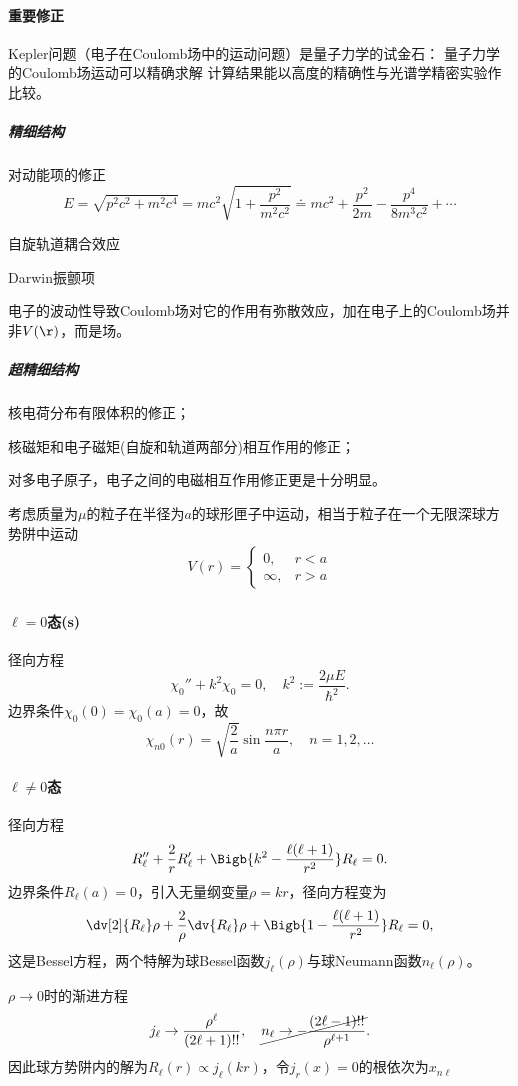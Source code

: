 \paragraph{重要修正}
Kepler问题（电子在Coulomb场中的运动问题）是量子力学的试金石：
量子力学的Coulomb场运动可以精确求解
计算结果能以高度的精确性与光谱学精密实验作比较。
\subparagraph*{精细结构}
\begin{compactenum}
	\item 对动能项的修正
	\[
		E=\sqrt{p^2c^2+m^2c^4}=mc^2\sqrt{1+\frac{p^2}{m^2c^2}}\doteq mc^2+\frac{p^2}{2m}-\frac{p^4}{8m^3c^2}+\cdots
	\]
	\item 自旋轨道耦合效应
	\item Darwin振颤项

	电子的波动性导致Coulomb场对它的作用有弥散效应，加在电子上的Coulomb场并非$V(\r)$，而是场。
\end{compactenum}
\subparagraph*{超精细结构}
\begin{compactenum}
	\item 核电荷分布有限体积的修正；
	\item 核磁矩和电子磁矩(自旋和轨道两部分)相互作用的修正；
	\item 对多电子原子，电子之间的电磁相互作用修正更是十分明显。
\end{compactenum}
考虑质量为$\mu$的粒子在半径为$a$的球形匣子中运动，相当于粒子在一个无限深球方势阱中运动
\begin{align*}
	V(r)=\begin{cases}
		0, & r<a \\[
	-1ex]\infty,&r>a
	\end{cases}
\end{align*}
\paragraph{$\ell=0$态(s)}径向方程
\[
	\chi_0''+k^2\chi_0=0,\quad k^2:=\frac{2\mu E}{\hbar^2}.
\]
边界条件$\chi_0(0)=\chi_0(a)=0$，故 
\[
	\chi_{n0}(r)=\sqrt{\frac2a}\sin\frac{n\pi r}a,\quad n=1,2,\ldots
\]
\paragraph{$\ell\neq 0$态}径向方程 
\[
	R_\ell''+\frac2rR_\ell'+\Bigb{k^2-\frac{\ell(\ell+1)}{r^2}}R_\ell=0.
\]
边界条件$R_\ell(a)=0$，引入无量纲变量$\rho=kr$，径向方程变为 
\[
	\dv[2]{R_\ell}\rho+\frac2\rho\dv{R_\ell}\rho+\Bigb{1-\frac{\ell(\ell+1)}{r^2}}R_\ell=0,
\]
这是Bessel方程，两个特解为球Bessel函数$j_\ell(\rho)$与球Neumann函数$n_\ell(\rho)$。

$\rho\to0$时的渐进方程
\[
	j_\ell\to\frac{\rho^\ell}{(2\ell+1)!!},\quad \cancel{n_\ell\to-\frac{(2\ell-1)!!}{\rho^{\ell+1}}}.
\]
因此球方势阱内的解为$R_\ell(r)\propto j_\ell(kr)$，令$j_r(x)=0$的根依次为$x_{n\ell}$
